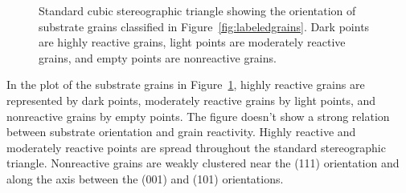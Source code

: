 \documentclass[12pt,%
              twoside,
               letterpaper]{uiothesis}
\begin{document}
\begin{figure}
	\begin{center}
	\caption[Orientation of substrate grains]{%
	Standard cubic stereographic triangle showing the orientation of
	substrate grains classified in Figure~\ref{fig:labeledgrains}. Dark points are
	highly reactive grains, light points are moderately reactive grains,
	and empty points are nonreactive grains.}
	\label{fig:substrateplot}
	\end{center}
\end{figure}
In the plot of the substrate grains in Figure~\ref{fig:substrateplot}, highly reactive grains
are represented by dark points, moderately reactive grains by light points, and
nonreactive grains by empty points. The figure doesn't show a strong relation between
substrate orientation and grain reactivity. Highly reactive and moderately reactive points
are spread throughout the standard stereographic triangle. Nonreactive grains are weakly
clustered near the (111) orientation and along the axis between the (001) and (101)
orientations.
\end{document}
